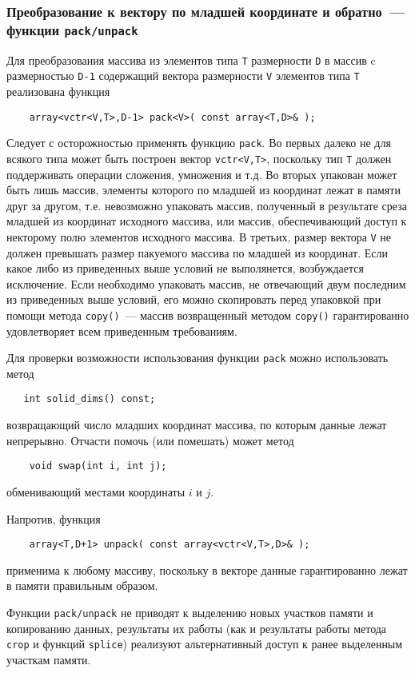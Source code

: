 \subsubsection{Преобразование к вектору по младшей координате и обратно~--- функции {\tt pack/unpack}}
Для преобразования массива из элементов типа {\tt T} размерности {\tt D} в
массив c размерностью {\tt D-1} содержащий вектора размерности
{\tt V} элементов типа {\tt T} реализована функция 
\begin{verbatim}
    array<vctr<V,T>,D-1> pack<V>( const array<T,D>& );
\end{verbatim}
Следует с осторожностью применять функцию {\tt pack}. Во первых далеко не
для всякого типа может быть построен вектор {\tt vctr<V,T>}, поскольку тип
{\tt T} должен поддерживать операции сложения, умножения и т.д. Во
вторых упакован может быть лишь массив, элементы которого по младшей из
координат лежат в памяти друг за другом, т.е. невозможно упаковать массив,
полученный в результате среза младшей из координат исходного массива, или
массив, обеспечивающий доступ к некторому полю элементов исходного массива. В
третьих, размер вектора {\tt V} не должен превышать размер пакуемого массива
по младшей из координат. Если какое либо из приведенных выше условий не
выполянется, возбуждается исключение. Если необходимо упаковать массив, не
отвечающий двум последним из приведенных выше условий, его можно скопировать перед упаковкой
при помощи метода {\tt copy()}~--- массив возвращенный методом {\tt copy()}
гарантированно удовлетворяет всем приведенным требованиям. 

Для проверки возможности использования функции {\tt pack} можно использовать
метод 
\begin{verbatim}
   int solid_dims() const;
\end{verbatim}
возвращающий число младших координат массива, по которым данные лежат
непрерывно.
Отчасти помочь (или помешать) может метод 
\begin{verbatim}
    void swap(int i, int j);
\end{verbatim}
обменивающий местами координаты $i$ и $j$.


Напротив, функция 
\begin{verbatim}
    array<T,D+1> unpack( const array<vctr<V,T>,D>& );
\end{verbatim}
применима к любому массиву, поскольку в векторе данные гарантированно лежат в памяти
правильным образом.

Функции {\tt pack/unpack} не приводят к выделению новых участков памяти и
копированию данных, результаты их работы (как и результаты работы метода {\tt
  crop} и функций {\tt splice}) реализуют альтернативный доступ к
ранее выделенным участкам
памяти.


